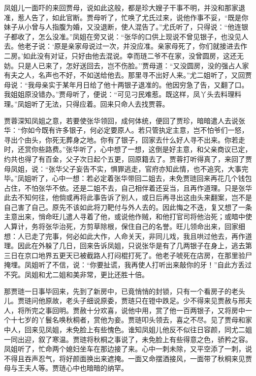 凤姐儿一面吓的来回贾母，说如此这般，都是珍大嫂子干事不明，并没和那家退准，惹人告了，如此官断。贾母听了，忙唤了尤氏过来，说他作事不妥，``既是你妹子从小曾与人指腹为婚，又没退断，使人混告了。''尤氏听了，只得说：``他连银子都收了，怎么没准。''凤姐在旁又说：``张华的口供上现说不曾见银子，也没见人去。他老子说：`原是亲家母说过一次，并没应准。亲家母死了，你们就接进去作二房。'如此没有对证，只好由他去混说。幸而琏二爷不在家，没曾圆房，这还无妨。只是人已来了，怎好送回去，岂不伤脸。''贾母道：``又没圆房，没的强占人家有夫之人，名声也不好，不如送给他去。那里寻不出好人来。''尤二姐听了，又回贾母说：``我母亲实于某年月日给了他十两银子退准的。他因穷急了告，又翻了口。我姐姐原没错办。''贾母听了，便说：``可见刁民难惹。既这样，凤丫头去料理料理。''凤姐听了无法，只得应着。回来只命人去找贾蓉。

贾蓉深知凤姐之意，若要使张华领回，成何体统，便回了贾珍，暗暗遣人去说张华：``你如今既有许多银子，何必定要原人。若只管执定主意，岂不怕爷们一怒，寻出个由头，你死无葬身之地。你有了银子，回家去什么好人寻不出来。你若走时，还赏你些路费。''张华听了，心中想了一想，这倒是好主意，和父亲商议已定，约共也得了有百金，父子次日起个五更，回原籍去了。贾蓉打听得真了，来回了贾母凤姐，说：``张华父子妄告不实，惧罪逃走，官府亦知此情，也不追究，大事完毕。''凤姐听了，心中一想：若必定着张华带回二姐去，未免贾琏回来再花几个钱包占住，不怕张华不依。还是二姐不去，自己相伴着还妥当，且再作道理。只是张华此去不知何往，他倘或再将此事告诉了别人，或日后再寻出这由头来翻案，岂不是自己害了自己。原先不该如此将刀靶付与外人去的。因此悔之不迭，复又想了一条主意出来，悄命旺儿遣人寻着了他，或说他作贼，和他打官司将他治死；或暗中使人算计，务将张华治死，方剪草除根，保住自己的名誉。旺儿领命出来，回家细想：人已走了完事，何必如此大作，人命关天，非同儿戏，我且哄过他去，再作道理。因此在外躲了几日，回来告诉凤姐，只说张华是有了几两银子在身上，逃去第三日在京口地界五更天已被截路人打闷棍打死了。他老子唬死在店房，在那里验尸掩埋。凤姐听了不信，说：``你要扯谎，我再使人打听出来敲你的牙！''自此方丢过不究。凤姐和尤二姐和美非常，更比还胜十倍。

那贾琏一日事毕回来，先到了新房中，已竟悄悄的封锁，只有一个看房子的老头儿。贾琏问他原故，老头子细说原委，贾琏只在镫中跌足。少不得来见贾赦与邢夫人，将所完之事回明。贾赦十分欢喜，说他中用，赏了他一百两银子，又将房中一个十七岁的丫鬟名唤秋桐者，赏他为妾。贾琏叩头领去，喜之不尽。见了贾母和家中人，回来见凤姐，未免脸上有些愧色。谁知凤姐儿他反不似往日容颜，同尤二姐一同出迎，叙了寒温。贾琏将秋桐之事说了，未免脸上有些得意之色，骄矜之容。凤姐听了，忙命两个媳妇坐车在那边接了来。心中一刺未除，又平空添了一刺，说不得且吞声忍气，将好颜面换出来遮掩。一面又命摆酒接风，一面带了秋桐来见贾母与王夫人等。贾琏心中也暗暗的纳罕。

